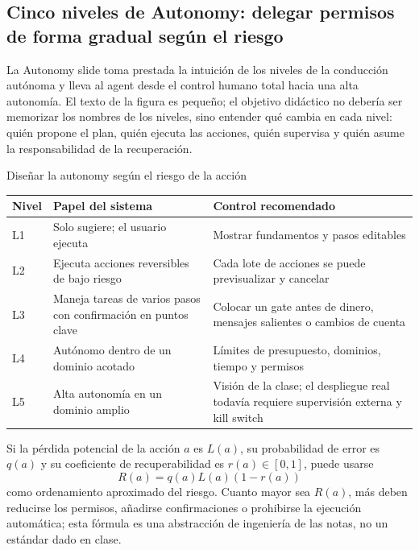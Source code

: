\subsection{Cinco niveles de Autonomy: delegar permisos de forma gradual según el riesgo}

La Autonomy slide toma prestada la intuición de los niveles de la conducción autónoma y lleva al agent desde el control humano total hacia una alta autonomía. El texto de la figura es pequeño; el objetivo didáctico no debería ser memorizar los nombres de los niveles, sino entender qué cambia en cada nivel: quién propone el plan, quién ejecuta las acciones, quién supervisa y quién asume la responsabilidad de la recuperación.


\begin{importantbox}{Diseñar la autonomy según el riesgo de la acción}
\begin{tabularx}{\textwidth}{L{0.10\textwidth}>{\raggedright\arraybackslash}X >{\raggedright\arraybackslash}X}
\toprule
Nivel & Papel del sistema & Control recomendado \\
\midrule
L1 & Solo sugiere; el usuario ejecuta & Mostrar fundamentos y pasos editables \\
L2 & Ejecuta acciones reversibles de bajo riesgo & Cada lote de acciones se puede previsualizar y cancelar \\
L3 & Maneja tareas de varios pasos con confirmación en puntos clave & Colocar un gate antes de dinero, mensajes salientes o cambios de cuenta \\
L4 & Autónomo dentro de un dominio acotado & Límites de presupuesto, dominios, tiempo y permisos \\
L5 & Alta autonomía en un dominio amplio & Visión de la clase; el despliegue real todavía requiere supervisión externa y kill switch \\
\bottomrule
\end{tabularx}
\end{importantbox}

Si la pérdida potencial de la acción $a$ es $L(a)$, su probabilidad de error es $q(a)$ y su coeficiente de recuperabilidad es $r(a)\in[0,1]$, puede usarse
\[
R(a)=q(a)L(a)(1-r(a))
\]
como ordenamiento aproximado del riesgo. Cuanto mayor sea $R(a)$, más deben reducirse los permisos, añadirse confirmaciones o prohibirse la ejecución automática; esta fórmula es una abstracción de ingeniería de las notas, no un estándar dado en clase.

